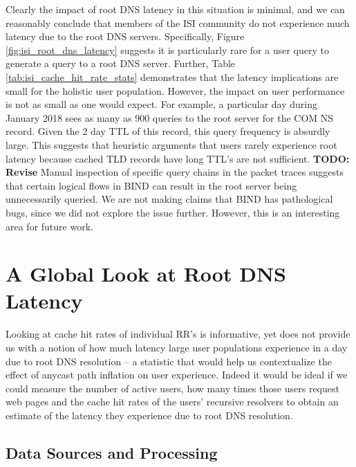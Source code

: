 \documentclass[sigconf,nonacm,10pt]{acmart}
\begin{document}
Clearly the impact of root DNS latency in this situation is minimal, and
we can reasonably conclude that members of the ISI community do not
experience much latency due to the root DNS servers. Specifically,
Figure \ref{fig:isi_root_dns_latency} suggests it is particularly rare
for a user query to generate a query to a root DNS server. Further,
Table \ref{tab:isi_cache_hit_rate_stats} demonstrates that the latency
implications are small for the holistic user population. However, the
impact on user performance is not as small as one would expect. For
example, a particular day during January 2018 sees as many as 900
queries to the root server for the COM NS record. Given the 2 day TTL of
this record, this query frequency is absurdly large. This suggests that
heuristic arguments that users rarely experience root latency because
cached TLD records have long TTL's are not sufficient. \break 
\textbf{TODO: Revise} Manual inspection of specific query chains in the
packet traces suggests that certain logical flows in BIND can result in
the root server being unnecessarily queried. We are not making claims
that BIND has pathological bugs, since we did not explore the issue
further. However, this is an interesting area for future work.

\section{A Global Look at Root DNS
Latency}\label{a-global-look-at-root-dns-latency}

\label{sec:rr_global_look} Looking at cache hit rates of individual RR's
is informative, yet does not provide us with a notion of how much
latency large user populations experience in a day due to root DNS
resolution -- a statistic that would help us contextualize the effect of
anycast path inflation on user experience. Indeed it would be ideal if
we could measure the number of active users, how many times those users
request web pages and the cache hit rates of the users' recursive
resolvers to obtain an estimate of the latency they experience due to
root DNS resolution.

\subsection{Data Sources and
Processing}\label{data-sources-and-processing-1}
\end{document}
